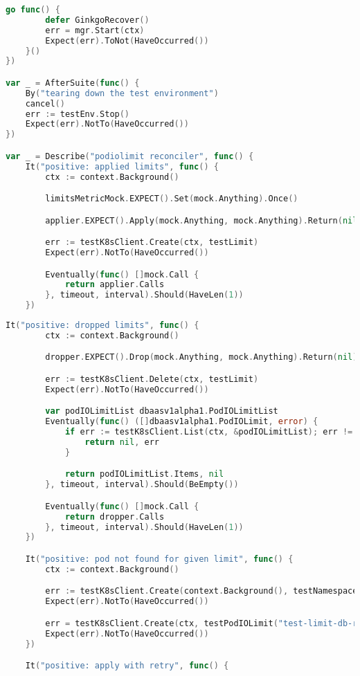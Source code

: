 \begin{appendices}
\begin{lstlisting}[language=Go,label=lst:int3, caption={Интеграционный тест (продолжение листинга~\ref{lst:int2})}]
	go func() {
		defer GinkgoRecover()
		err = mgr.Start(ctx)
		Expect(err).ToNot(HaveOccurred())
	}()
})

var _ = AfterSuite(func() {
	By("tearing down the test environment")
	cancel()
	err := testEnv.Stop()
	Expect(err).NotTo(HaveOccurred())
})

var _ = Describe("podiolimit reconciler", func() {
	It("positive: applied limits", func() {
		ctx := context.Background()

		limitsMetricMock.EXPECT().Set(mock.Anything).Once()

		applier.EXPECT().Apply(mock.Anything, mock.Anything).Return(nil).Once()

		err := testK8sClient.Create(ctx, testLimit)
		Expect(err).NotTo(HaveOccurred())

		Eventually(func() []mock.Call {
			return applier.Calls
		}, timeout, interval).Should(HaveLen(1))
	})
\end{lstlisting}

\begin{lstlisting}[language=Go,label=lst:int4, caption={Интеграционный тест (продолжение листинга~\ref{lst:int3})}]
	It("positive: dropped limits", func() {
		ctx := context.Background()

		dropper.EXPECT().Drop(mock.Anything, mock.Anything).Return(nil).Once()

		err := testK8sClient.Delete(ctx, testLimit)
		Expect(err).NotTo(HaveOccurred())

		var podIOLimitList dbaasv1alpha1.PodIOLimitList
		Eventually(func() ([]dbaasv1alpha1.PodIOLimit, error) {
			if err := testK8sClient.List(ctx, &podIOLimitList); err != nil {
				return nil, err
			}

			return podIOLimitList.Items, nil
		}, timeout, interval).Should(BeEmpty())

		Eventually(func() []mock.Call {
			return dropper.Calls
		}, timeout, interval).Should(HaveLen(1))
	})

	It("positive: pod not found for given limit", func() {
		ctx := context.Background()

		err := testK8sClient.Create(context.Background(), testNamespace("db2", "rs003"))
		Expect(err).NotTo(HaveOccurred())

		err = testK8sClient.Create(ctx, testPodIOLimit("test-limit-db-rs002", "db2", "rs003", 0))
		Expect(err).NotTo(HaveOccurred())
	})

	It("positive: apply with retry", func() {
\end{lstlisting}


\end{appendices}
